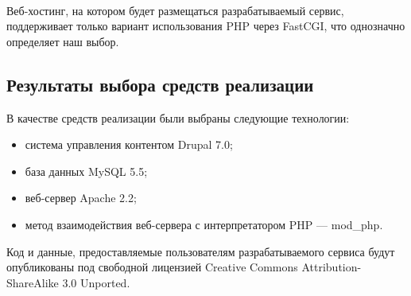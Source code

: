 \paragraph{}
Веб-хостинг, на котором будет размещаться разрабатываемый сервис, поддерживает только вариант использования PHP через FastCGI,
что однозначно определяет наш выбор.

\subsection{Результаты выбора средств реализации}
\label{ssec:choice_results}

В качестве средств реализации были выбраны следующие технологии:
\begin{itemize}
\item система управления контентом Drupal 7.0;
\item база данных MySQL 5.5;
\item веб-сервер Apache 2.2;
\item метод взаимодействия веб-сервера с интерпретатором PHP --- mod\_php.

\end{itemize}

Код и данные, предоставляемые пользователям разрабатываемого сервиса будут опубликованы 
под свободной лицензией Creative Commons Attribution-ShareAlike 3.0 Unported.